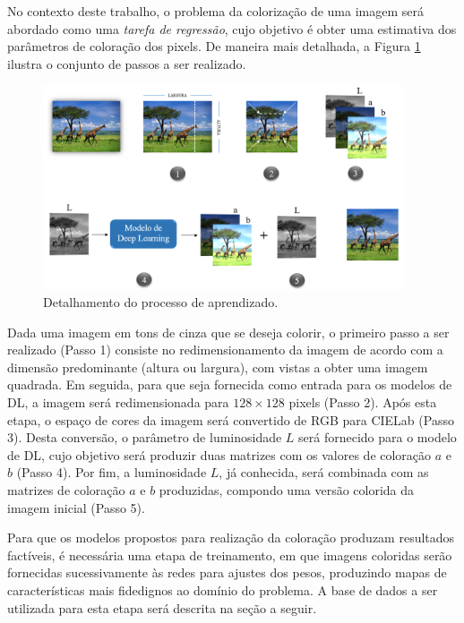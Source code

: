 No contexto deste trabalho, o problema da colorização de uma imagem será abordado como uma \emph{tarefa de regressão}, cujo objetivo é obter uma estimativa dos parâmetros de coloração dos pixels. De maneira mais detalhada, a Figura \ref{fig:aprendizado} ilustra o conjunto de passos a ser realizado.

\begin{figure}[h]
	\centering
	\includegraphics[width=0.95\textwidth]{./img/aprendizado}
	\caption{Detalhamento do processo de aprendizado.}
	\label{fig:aprendizado}
\end{figure}

Dada uma imagem em tons de cinza que se deseja colorir, o primeiro passo a ser realizado (Passo 1) consiste no redimensionamento da imagem de acordo com a dimensão predominante (altura ou largura), com vistas a obter uma imagem quadrada. Em seguida, para que seja fornecida como entrada para os modelos de DL, a imagem será redimensionada para $128 \times 128$ pixels (Passo 2). Após esta etapa, o espaço de cores da imagem será convertido de RGB para CIELab (Passo 3). Desta conversão, o parâmetro de luminosidade $L$ será fornecido para o modelo de DL, cujo objetivo será produzir duas matrizes com os valores de coloração $a$ e $b$ (Passo 4). Por fim, a luminosidade $L$, já conhecida, será combinada com as matrizes de coloração $a$ e $b$ produzidas, compondo uma versão colorida da imagem inicial (Passo 5).

Para que os modelos propostos para realização da coloração produzam resultados factíveis, é necessária uma etapa de treinamento, em que imagens coloridas serão fornecidas sucessivamente às redes para ajustes dos pesos, produzindo mapas de características mais fidedignos ao domínio do problema. A base de dados a ser utilizada para esta etapa será descrita na seção a seguir.

